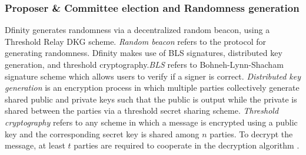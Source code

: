 \documentclass[10pt,journal,compsoc]{IEEEtran}
\begin{document}
\subsubsection{Proposer \& Committee election and Randomness generation}
Dfinity generates randomness via a decentralized random beacon, using a Threshold Relay DKG scheme. \emph{Random beacon} refers to the protocol for generating randomness. Dfinity makes use of BLS signatures, distributed key generation, and threshold cryptography.\emph{BLS} refers to Bohneh-Lynn-Shacham signature scheme which allows users to verify if a signer is correct\cite{BonehEtAl}. \emph{Distributed key generation} is an encryption process in which multiple parties collectively generate shared public and private keys such that the public is output while the private is shared between the parties via a threshold secret sharing scheme\cite{Mahnush}. \emph{Threshold cryptography} refers to any scheme in which a message is encrypted using a public key and the corresponding secret key is shared among $n$ parties. To decrypt the message, at least $t$ parties are required to cooperate in the decryption algorithm \cite{Mahnush}.
\end{document}
